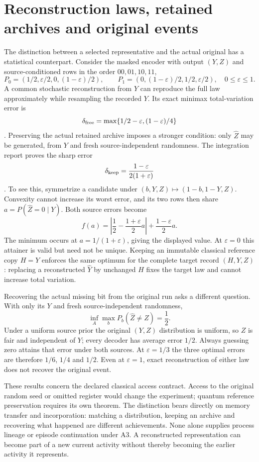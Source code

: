 \section{Reconstruction laws, retained archives and original events}\label{sec:archive-reconstruction-update}
The distinction between a selected representative and the actual original has a statistical counterpart. Consider the masked encoder with output $(Y,Z)$ and source-conditioned rows in the order $00,01,10,11$,
\[
P_0=(1/2,\varepsilon/2,0,(1-\varepsilon)/2),\qquad
P_1=(0,(1-\varepsilon)/2,1/2,\varepsilon/2),\quad0\le\varepsilon\le1.
\]
A common stochastic reconstruction from $Y$ can reproduce the full law approximately while resampling the recorded $Y$. Its exact minimax total-variation error is
\[
\delta_{\rm free}=\max\{1/2-\varepsilon,(1-\varepsilon)/4\}
\]
\cite{RodgersBoundaries2026}. Preserving the actual retained archive imposes a stronger condition: only $\widehat Z$ may be generated, from $Y$ and fresh source-independent randomness. The integration report proves the sharp error
\[
\delta_{\rm keep}=\frac{1-\varepsilon}{2(1+\varepsilon)}
\]
\cite{RodgersIntegration2026}. To see this, symmetrize a candidate under $(b,Y,Z)\mapsto(1-b,1-Y,Z)$. Convexity cannot increase its worst error, and its two rows then share $a=P(\widehat Z=0\mid Y)$. Both source errors become
\[
f(a)=\left|\frac12-\frac{1+\varepsilon}{2}a\right|
      +\frac{1-\varepsilon}{2}a.
\]
The minimum occurs at $a=1/(1+\varepsilon)$, giving the displayed value. At $\varepsilon=0$ this attainer is valid but need not be unique. Keeping an immutable classical reference copy $H=Y$ enforces the same optimum for the complete target record $(H,Y,Z)$: replacing a reconstructed $\widehat Y$ by unchanged $H$ fixes the target law and cannot increase total variation.

Recovering the actual missing bit from the original run asks a different question. With only its $Y$ and fresh source-independent randomness,
\[
\inf_A\max_bP_b(\widehat Z\ne Z)=\frac12.
\]
Under a uniform source prior the original $(Y,Z)$ distribution is uniform, so $Z$ is fair and independent of $Y$; every decoder has average error $1/2$. Always guessing zero attains that error under both sources. At $\varepsilon=1/3$ the three optimal errors are therefore $1/6$, $1/4$ and $1/2$. Even at $\varepsilon=1$, exact reconstruction of either law does not recover the original event.

These results concern the declared classical access contract. Access to the original random seed or omitted register would change the experiment; quantum reference preservation requires its own theorem. The distinction bears directly on memory transfer and incorporation: matching a distribution, keeping an archive and recovering what happened are different achievements. None alone supplies process lineage or episode continuation under A3. A reconstructed representation can become part of a new current activity without thereby becoming the earlier activity it represents.

